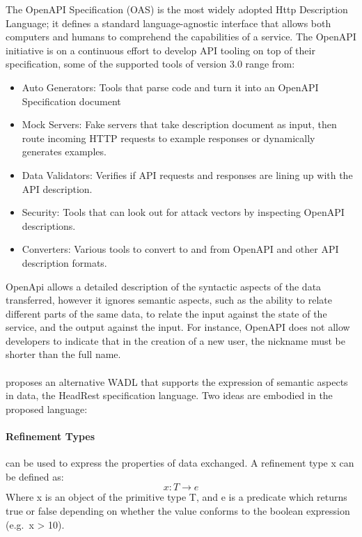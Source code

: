 The OpenAPI Specification (OAS) \cite{openAPI} is the most widely adopted Http Description Language;
it defines a standard language-agnostic interface that allows both computers and humans to comprehend the capabilities of a service.
The OpenAPI initiative is on a continuous effort to develop API tooling on top of their specification, some of the supported tools of version 3.0 range from:

\begin{itemize}
    \setlength\itemsep{0em}
    \item Auto Generators: Tools that parse code and turn it into an OpenAPI Specification document
    \item Mock Servers: Fake servers that take description document as input, then route incoming HTTP requests to example responses or dynamically generates examples.
    \item Data Validators: Verifies if API requests and responses are lining up with the API description.
    \item Security: Tools that can look out for attack vectors by inspecting OpenAPI descriptions.
    \item Converters: Various tools to convert to and from OpenAPI and other API description formats.
\end{itemize}

OpenApi allows a detailed description of the syntactic aspects of the data transferred, however it ignores semantic aspects, such as the ability to relate
different parts of the same data, to relate the input against the state of the service, and the output against the input.
For instance, OpenAPI does not allow developers to indicate that in the creation of a new user, the nickname must be shorter
than the full name.

\paragraph{}

\citeauthor{headRest} \cite{headRest} proposes an alternative WADL that supports the expression of semantic aspects in data, the HeadRest specification language.
Two ideas are embodied in the proposed language:

\paragraph{Refinement Types} \cite{freeman1991refinement} can be used to express the properties of data exchanged.
A refinement type x can be defined as:
\[ x:T \rightarrow e \]
Where x is an object of the primitive type T, and e is a predicate which returns true or false depending on whether the value conforms to the boolean expression (e.g.\ x > 10).

